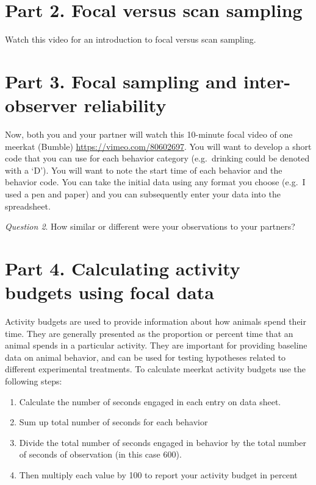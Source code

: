 \documentclass[]{book}
\providecommand{\tightlist}{%
  \setlength{\itemsep}{0pt}\setlength{\parskip}{0pt}}
\begin{document}
\hypertarget{part-2.-focal-versus-scan-sampling}{%
\section*{Part 2. Focal versus scan sampling}\label{part-2.-focal-versus-scan-sampling}}

Watch this video for an introduction to focal versus scan sampling.

\hypertarget{part-3.-focal-sampling-and-inter-observer-reliability}{%
\section*{Part 3. Focal sampling and inter-observer reliability}\label{part-3.-focal-sampling-and-inter-observer-reliability}}

Now, both you and your partner will watch this 10-minute focal video of one meerkat (Bumble) \url{https://vimeo.com/80602697}. You will want to develop a short code that you can use for each behavior category (e.g.~drinking could be denoted with a `D'). You will want to note the start time of each behavior and the behavior code. You can take the initial data using any format you choose (e.g.~I used a pen and paper) and you can subsequently enter your data into the spreadsheet.

\emph{Question 2}. How similar or different were your observations to your partners?

\hypertarget{part-4.-calculating-activity-budgets-using-focal-data}{%
\section*{Part 4. Calculating activity budgets using focal data}\label{part-4.-calculating-activity-budgets-using-focal-data}}

Activity budgets are used to provide information about how animals spend their time. They are generally presented as the proportion or percent time that an animal spends in a particular activity. They are important for providing baseline data on animal behavior, and can be used for testing hypotheses related to different experimental treatments. To calculate meerkat activity budgets use the following steps:

\begin{enumerate}
\def\labelenumi{\arabic{enumi}.}
\tightlist
\item
  Calculate the number of seconds engaged in each entry on data sheet.
\item
  Sum up total number of seconds for each behavior
\item
  Divide the total number of seconds engaged in behavior by the total number of seconds of observation (in this case 600).
\item
  Then multiply each value by 100 to report your activity budget in percent
\end{enumerate}
\end{document}
